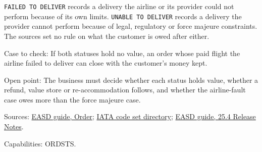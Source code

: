 \begin{definition}
  \label{def:delivery-failed-delivery-owed}
  \notready
  \texttt{FAILED TO DELIVER} records a delivery the airline or its provider
  could not perform because of its own limits. \texttt{UNABLE TO DELIVER}
  records a delivery the provider cannot perform because of legal,
  regulatory or force majeure constraints. The sources set no rule on what
  the customer is owed after either.

  Case to check: If both statuses hold no value, an order whose paid flight
  the airline failed to deliver can close with the customer's money kept.

  Open point: The business must decide whether each status holds value,
  whether a refund, value store or re-accommodation follows, and whether the
  airline-fault case owes more than the force majeure case.

  Sources: \href{https://standards.atlassian.net/wiki/spaces/EASD/pages/574849062/Order}{EASD guide, Order};
  \href{https://standards.atlassian.net/wiki/spaces/AIDM/pages/607420437/View+IATA+Codeset+Directory}{IATA code set directory};
  \href{https://standards.atlassian.net/wiki/spaces/EASD/pages/2533031940}{EASD guide, 25.4 Release Notes}.

  Capabilities: ORDSTS.
\end{definition}


